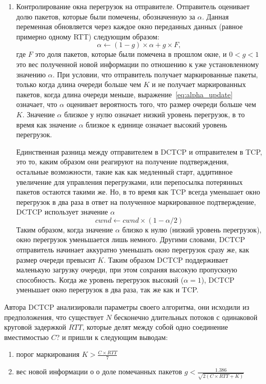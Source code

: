 \documentclass[14pt, a4paper,oneside]{extarticle}
\begin{document}
\begin{enumerate}
\item
Контролирование окна перегрузок на отправителе.
Отправитель оценивает долю пакетов, которые были помечены, обозначенную за $\alpha$. Данная переменная обновляется через каждое окно переданных данных (равное примерно одному RTT) следующим образом:
\begin{equation} \label{eq:alpha_update}
\alpha \leftarrow (1 - g) \times \alpha + g \times F,
\end{equation}
где $F$ это доля пакетов, которые были помечена в прошлом окне, и $0 < g < 1$ это вес полученной новой информации по отношению к уже установленному значению $\alpha$. При условии, что отправитель получает маркированные пакеты, только когда длина очереди больше чем $K$ и не получает маркированных пакетов, когда длина очереди меньше, выражение~\eqref{eq:alpha_update} означает, что $\alpha$ оценивает вероятность того, что размер очереди больше чем $K$. Значение $\alpha$ близкое у нулю означает низкий уровень перегрузок, в то время как значение $\alpha$ близкое к единице означает высокий уровень перегрузок.

Единственная разница между отправителем в DCTCP и отправителем в TCP, это то, каким образом они реагируют на получение подтверждения, остальные возможности, такие как как медленный старт, аддитивное увеличение для управления перегрузками, или перепосылка потерянных пакетов остаются такими же.
Но, в то время как TCP всегда уменьшает окно перегрузок в два раза в ответ на полученное маркированное подтверждение, DCTCP использует значение $\alpha$
\begin{equation} \label{eq:cwnd}
cwnd \leftarrow cwnd \times (1 - \alpha/2)
\end{equation}
Таким образом, когда значение $\alpha$ близко к нулю (низкий уровень перегрузок), окно перегрузок уменьшается лишь немного. Другими словами, DCTCP отправитель начинает аккуратно уменьшать окно перегрузок сразу же, как размер очереди превысит $K$. Таким образом DCTCP поддерживает маленькую загрузку очереди, при этом сохраняя высокую пропускную способность. Когда же уровень перегрузок высокий ($\alpha = 1$), DCTCP уменьшает окно перегрузок в два раза, так же как и TCP.
\end{enumerate}

Автора DCTCP анализировали параметры своего алгоритма, они исходили из предположения, что существует $N$ бесконечно длительных потоков с одинаковой круговой задержкой $RTT$, которые делят между собой одно соединение вместимостью $C$? и пришли к следующим выводам:
\begin{enumerate}
\item порог маркирования $K > \frac{C \times RTT}{7}$
\item вес новой информации о о доле помечанных пакетов $g < \frac{1.386}{\sqrt{2(C \times RTT + K)}}$
\end{enumerate}
\end{document}
